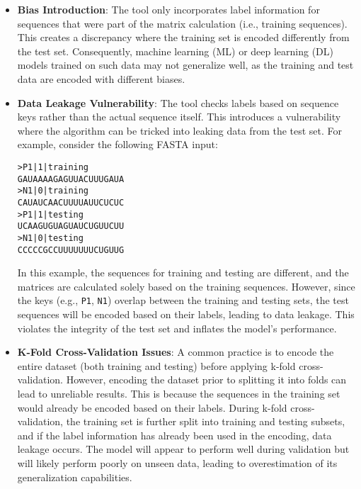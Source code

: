       \begin{itemize}
        \item \textbf{Bias Introduction}: The tool only incorporates label information for sequences that were part of the matrix calculation (i.e., training sequences).
        This creates a discrepancy where the training set is encoded differently from the test set.
        Consequently, machine learning (ML) or deep learning (DL) models trained on such data may not generalize well, as the training and test data are encoded with different biases.

        \item \textbf{Data Leakage Vulnerability}: The tool checks labels based on sequence keys rather than the actual sequence itself.
        This introduces a vulnerability where the algorithm can be tricked into leaking data from the test set.
        For example, consider the following FASTA input:

        \begin{verbatim}
>P1|1|training
GAUAAAAGAGUUACUUUGAUA
>N1|0|training
CAUAUCAACUUUUAUUCUCUC
>P1|1|testing
UCAAGUGUAGUAUCUGUUCUU
>N1|0|testing
CCCCCGCCUUUUUUUCUGUUG
        \end{verbatim}

        In this example, the sequences for training and testing are different, and the matrices are calculated solely based on the training sequences.
        However, since the keys (e.g., \texttt{P1}, \texttt{N1}) overlap between the training and testing sets, the test sequences will be encoded based on their labels, leading to data leakage.
        This violates the integrity of the test set and inflates the model’s performance.

        \item \textbf{K-Fold Cross-Validation Issues}: A common practice is to encode the entire dataset (both training and testing) before applying k-fold cross-validation.
        However, encoding the dataset prior to splitting it into folds can lead to unreliable results.
        This is because the sequences in the training set would already be encoded based on their labels.
        During k-fold cross-validation, the training set is further split into training and testing subsets, and if the label information has already been used in the encoding, data leakage occurs.
        The model will appear to perform well during validation but will likely perform poorly on unseen data, leading to overestimation of its generalization capabilities.
      \end{itemize}

